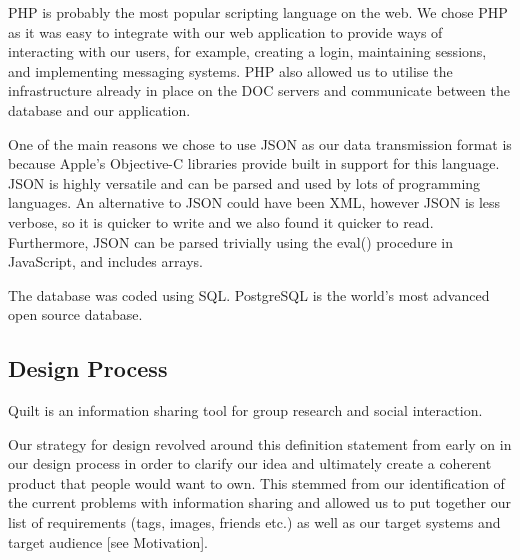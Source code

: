 \documentclass[a4wide, 10pt]{article}
\begin{document}
PHP is probably the most popular scripting language on the web. We chose PHP as it was easy to integrate with our web application to provide ways of interacting with our users, for example, creating a login, maintaining sessions, and implementing messaging systems. PHP also allowed us to utilise the infrastructure already in place on the DOC servers and communicate between the database and our application. 
 
One of the main reasons we chose to use JSON as our data transmission format is because Apple's Objective-C libraries provide built in support for this language. JSON is highly versatile and can be parsed and used by lots of programming languages. An alternative to JSON could have been XML, however JSON is less verbose, so it is quicker to write and we also found it quicker to read. Furthermore, JSON can be parsed trivially using the eval() procedure in JavaScript, and includes arrays. 

The database was coded using SQL. PostgreSQL is the world's most advanced open source database.

\subsection{Design Process}

Quilt is an information sharing tool for group research and social interaction.

Our strategy for design revolved around this definition statement from early on in our design process in order to clarify our idea and ultimately create a coherent product that people would want to own. This stemmed from our identification of the current problems with information sharing and allowed us to put together our list of requirements (tags, images, friends etc.) as well as our target systems and target audience [see Motivation].
\end{document}
